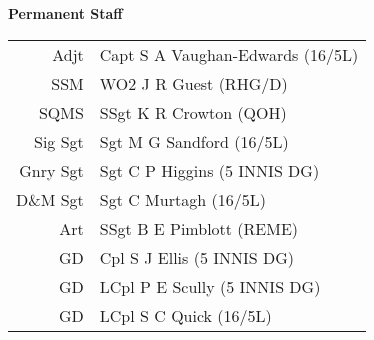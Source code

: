 \begin{center}
  \Large
  \textbf{Permanent Staff}
\end{center}

\begin{center}
  \begin{tabular}{rl}
    Adjt & Capt S A Vaughan-Edwards (16/5L) \\
    SSM & WO2 J R Guest (RHG/D) \\
    SQMS & SSgt K R Crowton (QOH) \\
    Sig Sgt & Sgt M G Sandford (16/5L) \\
    Gnry Sgt & Sgt C P Higgins (5 INNIS DG) \\
    D\&M Sgt & Sgt C Murtagh (16/5L) \\
    Art & SSgt B E Pimblott (REME) \\
    GD & Cpl S J Ellis (5 INNIS DG) \\
    GD & LCpl P E Scully (5 INNIS DG) \\
    GD & LCpl S C Quick (16/5L) \\
  \end{tabular}
\end{center}
